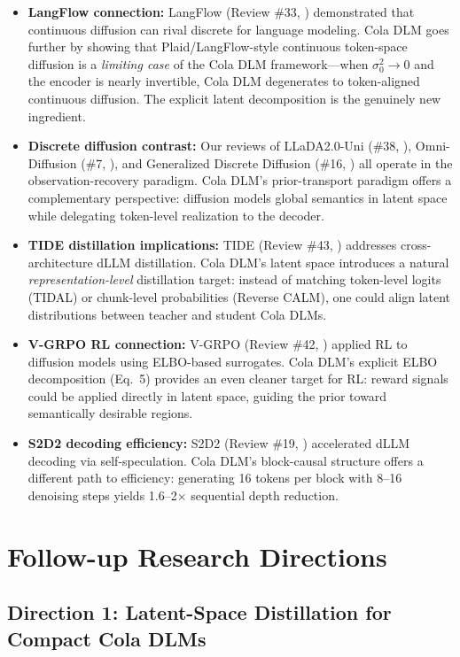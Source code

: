\documentclass[11pt]{article}
\begin{document}
\begin{itemize}
    \item \textbf{LangFlow connection:} LangFlow (Review \#33, \cite{langflow}) demonstrated that continuous diffusion can rival discrete for language modeling. Cola DLM goes further by showing that Plaid/LangFlow-style continuous token-space diffusion is a \emph{limiting case} of the Cola DLM framework---when $\sigma_0^2 \to 0$ and the encoder is nearly invertible, Cola DLM degenerates to token-aligned continuous diffusion. The explicit latent decomposition is the genuinely new ingredient.
    \item \textbf{Discrete diffusion contrast:} Our reviews of LLaDA2.0-Uni (\#38, \cite{llada2uni}), Omni-Diffusion (\#7, \cite{omnidiff}), and Generalized Discrete Diffusion (\#16, \cite{gendiff}) all operate in the observation-recovery paradigm. Cola DLM's prior-transport paradigm offers a complementary perspective: diffusion models global semantics in latent space while delegating token-level realization to the decoder.
    \item \textbf{TIDE distillation implications:} TIDE (Review \#43, \cite{tide}) addresses cross-architecture dLLM distillation. Cola DLM's latent space introduces a natural \emph{representation-level} distillation target: instead of matching token-level logits (TIDAL) or chunk-level probabilities (Reverse CALM), one could align latent distributions between teacher and student Cola DLMs.
    \item \textbf{V-GRPO RL connection:} V-GRPO (Review \#42, \cite{vgrpo}) applied RL to diffusion models using ELBO-based surrogates. Cola DLM's explicit ELBO decomposition (Eq.\ 5) provides an even cleaner target for RL: reward signals could be applied directly in latent space, guiding the prior toward semantically desirable regions.
    \item \textbf{S2D2 decoding efficiency:} S2D2 (Review \#19, \cite{s2d2}) accelerated dLLM decoding via self-speculation. Cola DLM's block-causal structure offers a different path to efficiency: generating 16 tokens per block with 8--16 denoising steps yields 1.6--2$\times$ sequential depth reduction.
\end{itemize}

\section{Follow-up Research Directions}

\subsection{Direction 1: Latent-Space Distillation for Compact Cola DLMs}
\end{document}
